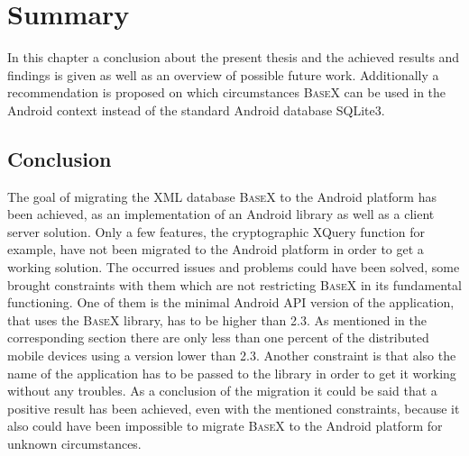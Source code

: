 \chapter{Summary}
\label{cha:summery}
In this chapter a conclusion about the present thesis and the achieved results and findings is given as well as an overview of possible future work.
Additionally a recommendation is proposed on which circumstances \textsc{BaseX} can be used in the Android context instead of the standard Android database SQLite3.
\section{Conclusion}
\label{sec:summery:conclusion}
The goal of migrating the XML database \textsc{BaseX} to the Android platform has been achieved, as an implementation of an Android library as well as a client server solution.
Only a few features, the cryptographic XQuery function for example, have not been migrated to the Android platform in order to get a working solution.
The occurred issues and problems could have been solved, some brought constraints with them which are not restricting \textsc{BaseX} in its fundamental functioning.
One of them is the minimal Android API version of the application, that uses the \textsc{BaseX} library, has to be higher than 2.3.
As mentioned in the corresponding section there are only less than one percent of the distributed mobile devices using a version lower than 2.3.
Another constraint is that also the name of the application has to be passed to the library in order to get it working without any troubles.
As a conclusion of the migration it could be said that a positive result has been achieved, even with the mentioned constraints, because it also could have been impossible to migrate \textsc{BaseX} to the Android platform for unknown circumstances.





